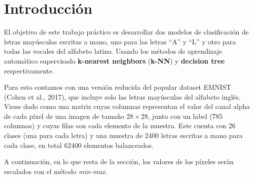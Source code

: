 \documentclass[11pt,a4paper, twocolumn]{article}
\begin{document}

\fecha{\today}


\onecolumn

\maketitle


\section{Introducción}

El objetivo de este trabajo práctico es desarrollar dos modelos de clasificación de letras mayúsculas escritas a mano, uno para las letras ``A'' y ``L'' y otro para todas las vocales del alfabeto latino. Usando los métodos de aprendizaje automático supervisado \textbf{k-nearest neighbors} (\textbf{k-NN}) y \textbf{decision tree} respectivamente.

Para esto contamos con una versión reducida del popular dataset EMNIST (Cohen et al., 2017), que incluye solo las letras mayúsculas del alfabeto inglés. Viene dado como una matriz cuyas columnas representan el valor del canal alpha de cada píxel de una imagen de tamaño $28 \times 28$, junto con un label (785 columnas) y cuyas filas son cada elemento de la muestra. Este cuenta con 26 clases (una para cada letra) y una muestra de 2400 letras escritas a mano para cada clase, en total 62400 elementos balanceados.

A continuación, en lo que resta de la sección, los valores de los píxeles serán escalados con el método \textit{min-max}.
\end{document}

